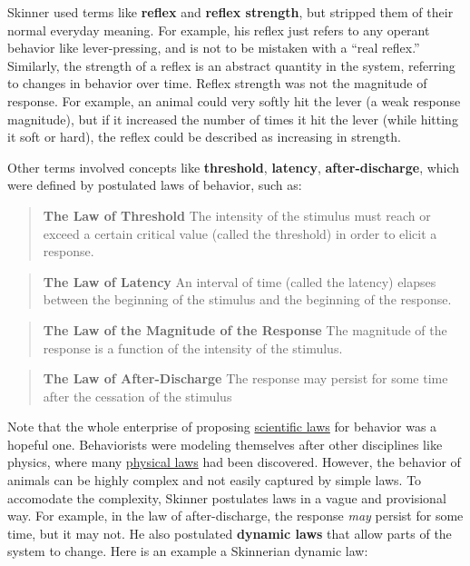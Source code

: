 \documentclass[
  oneside,
  12pt]{crumpbook}
\begin{document}
Skinner used terms like \textbf{reflex} and \textbf{reflex strength}, but stripped them of their normal everyday meaning. For example, his reflex just refers to any operant behavior like lever-pressing, and is not to be mistaken with a ``real reflex.'' Similarly, the strength of a reflex is an abstract quantity in the system, referring to changes in behavior over time. Reflex strength was not the magnitude of response. For example, an animal could very softly hit the lever (a weak response magnitude), but if it increased the number of times it hit the lever (while hitting it soft or hard), the reflex could be described as increasing in strength.

Other terms involved concepts like \textbf{threshold}, \textbf{latency}, \textbf{after-discharge}, which were defined by postulated laws of behavior, such as:

\begin{quote}
\textbf{The Law of Threshold} The intensity of the stimulus must reach or exceed a certain critical value (called the threshold) in order to elicit a response.
\end{quote}

\begin{quote}
\textbf{The Law of Latency} An interval of time (called the latency) elapses between the beginning of the stimulus and the beginning of the response.
\end{quote}

\begin{quote}
\textbf{The Law of the Magnitude of the Response} The magnitude of the response is a function of the intensity of the stimulus.
\end{quote}

\begin{quote}
\textbf{The Law of After-Discharge} The response may persist for some time after the cessation of the stimulus
\end{quote}

Note that the whole enterprise of proposing \href{https://en.wikipedia.org/wiki/Scientific_law}{scientific laws} for behavior was a hopeful one. Behaviorists were modeling themselves after other disciplines like physics, where many \href{https://en.wikipedia.org/wiki/Scientific_law\#Laws_of_physics}{physical laws} had been discovered. However, the behavior of animals can be highly complex and not easily captured by simple laws. To accomodate the complexity, Skinner postulates laws in a vague and provisional way. For example, in the law of after-discharge, the response \emph{may} persist for some time, but it may not. He also postulated \textbf{dynamic laws} that allow parts of the system to change. Here is an example a Skinnerian dynamic law:
\end{document}
